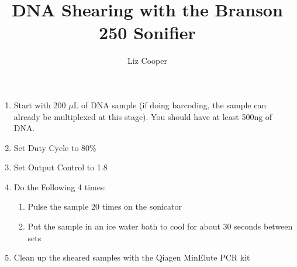 \documentclass{article}
\begin{document}
\title{DNA Shearing with the Branson 250 Sonifier}
\author{Liz Cooper}
\maketitle
\begin{enumerate}
\item   Start with 200 $\mu$L of DNA sample (if doing barcoding, the sample can already be multiplexed at this stage).  You should have at least 500ng of DNA.

\item Set Duty Cycle to 80\%

\item Set Output Control to 1.8

\item Do the Following 4 times:
\begin{enumerate}
	\item Pulse the sample 20 times on the sonicator
	\item Put the sample in an ice water bath to cool for about 30 seconds between sets 
\end{enumerate}

\item Clean up the sheared samples with the Qiagen MinElute PCR kit
\end{enumerate}
\end{document}
